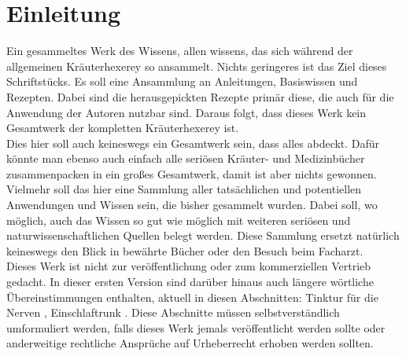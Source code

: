 \chapter{Einleitung}


Ein gesammeltes Werk des Wissens, allen wissens, das sich während der allgemeinen Kräuterhexerey so ansammelt. Nichts geringeres ist das Ziel dieses Schriftstücks. Es soll eine Ansammlung an Anleitungen, Basiswissen und Rezepten. Dabei sind die herausgepickten Rezepte primär diese, die auch für die Anwendung der Autoren nutzbar sind. Daraus folgt, dass dieses Werk kein Gesamtwerk der kompletten Kräuterhexerey ist.\\

Dies hier soll auch keineswegs ein Gesamtwerk sein, dass alles abdeckt. Dafür könnte man ebenso auch einfach alle seriösen Kräuter- und Medizinbücher zusammenpacken in ein großes Gesamtwerk, damit ist aber nichts gewonnen. Vielmehr soll das hier eine Sammlung aller tatsächlichen und potentiellen Anwendungen und Wissen sein, die bisher gesammelt wurden. Dabei soll, wo möglich, auch das Wissen so gut wie möglich mit weiteren seriösen und naturwissenschaftlichen Quellen belegt werden. Diese Sammlung ersetzt natürlich keineswegs den Blick in bewährte Bücher oder den Besuch beim Facharzt.\\

Dieses Werk ist nicht zur veröffentlichung oder zum kommerziellen Vertrieb gedacht. In dieser ersten Version sind darüber hinaus auch längere wörtliche Übereinstimmungen enthalten, aktuell in diesen Abschnitten: Tinktur für die Nerven \cite{nedoma2018heiltinkturen}, Einschlaftrunk \cite{nedoma2018heiltinkturen}. Diese Abschnitte müssen selbstverständlich umformuliert werden, falls dieses Werk jemals veröffentlicht werden sollte oder anderweitige rechtliche Ansprüche auf Urheberrecht erhoben werden sollten.
